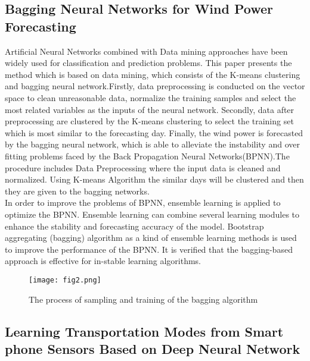 \documentclass[10pt,a4paper,journal]{IEEEtran}
\begin{document}
 



\subsection{Bagging Neural Networks for Wind Power Forecasting\cite{1}}
\hspace{2em}  Artificial Neural Networks combined with Data mining approaches have been widely used for classification and prediction problems. This paper presents the method which is based on data mining, which consists of the K-means clustering and bagging neural network.Firstly, data preprocessing is conducted on the vector space to clean unreasonable data, normalize the training samples and select the most related variables as the inputs of the neural network. Secondly, data after preprocessing are clustered by the K-means clustering to select the training set which is most similar to the forecasting day. Finally, the wind power is forecasted by the bagging neural network, which is able to alleviate the instability and
over fitting problems faced by the Back Propagation Neural Networks(BPNN).The procedure includes Data Preprocessing where the input data is cleaned and normalized. Using K-means Algorithm the similar days will be clustered and then they are given to the bagging networks. \\

\hspace{2em} In order to improve the problems of BPNN, ensemble learning
is applied to optimize the BPNN. Ensemble learning can
combine several learning modules to enhance the stability and
forecasting accuracy of the model. Bootstrap aggregating (bagging) algorithm as a kind of ensemble learning methods is used
to improve the performance of the BPNN. It is verified that
the bagging-based approach is effective for in-stable learning
algorithms.

\begin{figure}[htbp]
\centering
\texttt{[image: fig2.png]}
\caption{The process of sampling and training of the bagging algorithm\cite{1}}
\label{1}
\end{figure}



\subsection{Learning Transportation Modes from Smart phone Sensors Based on Deep Neural Network\cite{2}}
\end{document}
